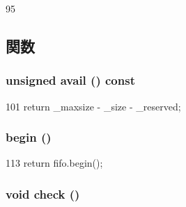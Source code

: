 \begin{DoxyCode}
95 {}
\end{DoxyCode}


\subsection{関数}
\hypertarget{classPacketFifo_aaf2f31de7b8cd9bf2085049b07125b1e}{
\subsubsection[{avail}]{\setlength{\rightskip}{0pt plus 5cm}unsigned avail () const}}
\label{classPacketFifo_aaf2f31de7b8cd9bf2085049b07125b1e}



\begin{DoxyCode}
101 { return _maxsize - _size - _reserved; }
\end{DoxyCode}
\hypertarget{classPacketFifo_ad69bd11391be1a1dba5c8202259664f8}{
\subsubsection[{begin}]{ begin ()}}
\label{classPacketFifo_ad69bd11391be1a1dba5c8202259664f8}



\begin{DoxyCode}
113 { return fifo.begin(); }
\end{DoxyCode}
\hypertarget{classPacketFifo_a83f8adca24e250bfb5c9a90a35503ae9}{
\subsubsection[{check}]{\setlength{\rightskip}{0pt plus 5cm}void check ()}}
\label{classPacketFifo_a83f8adca24e250bfb5c9a90a35503ae9}



